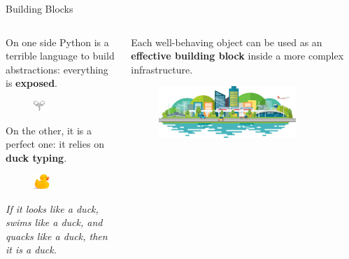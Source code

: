 \documentclass[9pt]{beamer}
\begin{document}
\begin{frame}{Building Blocks}
    \vspace*{20pt}
    \begin{columns}
        \begin{column}{0.5\textwidth}
            On one side Python is a terrible language to build abstractions:
            everything is \textbf{exposed}.
            \begin{figure}
                \centering
                \includegraphics[width=0.2\textwidth]{capsule}
            \end{figure}

            On the other, it is a perfect one: it relies on \textbf{duck typing}.
            \begin{figure}
                \centering
                \includegraphics[width=0.3\textwidth]{duck.png}
            \end{figure}

            \begin{center}
                \itshape
                If it looks like a duck, swims like a duck, and quacks like a
                duck, then it is a duck.
            \end{center}
        \end{column}
        \begin{column}{0.5\textwidth}
            Each well-behaving object can be used as an \textbf{effective
            building block} inside a more complex infrastructure.
            \vspace*{20pt}

            \begin{figure}
                \centering
                \includegraphics[width=0.8\textwidth]{infrastructure}
            \end{figure}
            \vspace*{20pt}


\end{column}
\end{columns}
\end{frame}
\end{document}
